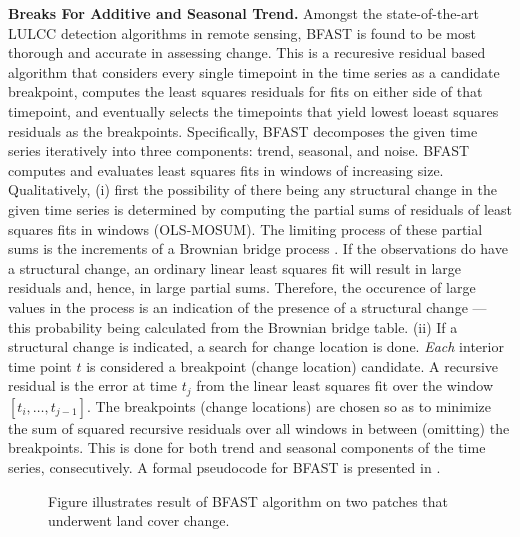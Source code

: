 \documentclass[a4paper,11pt]{article}
\begin{document}
{\bf Breaks For Additive and Seasonal Trend.} Amongst the state-of-the-art
LULCC detection algorithms in remote sensing, BFAST \cite{VerbesseltC} is found
to be most thorough and accurate in assessing change. This
is a recuresive residual based algorithm that considers every
single timepoint in the time series as a candidate breakpoint, computes the
least squares residuals for fits on either side of that timepoint, and
eventually selects the timepoints that yield lowest loeast squares residuals
as the breakpoints. Specifically, BFAST decomposes the given time series
iteratively into three components:
trend, seasonal, and noise. BFAST computes and evaluates least squares fits
in windows of increasing size. 
Qualitatively, (i) first the possibility of there being any structural change
in the given time series is determined by computing the partial sums of
residuals of least squares fits in windows (OLS-MOSUM). The limiting
process of these partial sums is the increments of a Brownian bridge 
process \cite{OLSMosum}. If the observations do have a structural change,
an ordinary linear least squares fit will result in large residuals
and, hence, in large partial sums. Therefore, the occurence of large values
in the process is an indication of the
presence of a structural change --- this probability being calculated 
from the Brownian bridge table.
(ii) If a structural change is indicated, a search for change 
location is done. {\it Each} interior time point $t$ is considered
a breakpoint (change location) candidate. 
A recursive residual is the error at time $t_j$ from the linear least squares
fit over the window $[t_i,\ldots, t_{j-1}]$. The breakpoints (change 
locations) are chosen so as to minimize the sum of squared 
recursive residuals over all windows
in between (omitting) the breakpoints.
This is done for both trend and seasonal components of the time series,
consecutively. A formal pseudocode for BFAST is presented in \cite{swwtHPC}.
\begin{figure}
\centering
    \qquad
    \caption{Figure illustrates result of BFAST algorithm on two patches that underwent land cover change.}%
    \label{fig:example}%
\end{figure}
\end{document}
